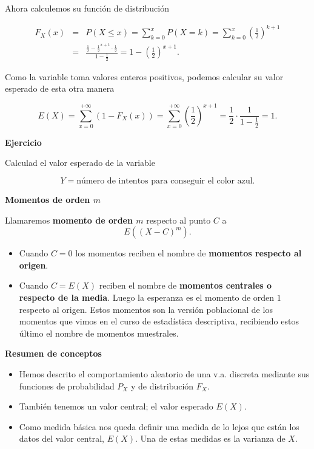 \documentclass[
  letterpaper,
  DIV=11,
  numbers=noendperiod]{scrreprt}
\providecommand{\tightlist}{%
  \setlength{\itemsep}{0pt}\setlength{\parskip}{0pt}}\usepackage{longtable,booktabs,array}
\begin{document}
Ahora calculemos su función de distribución

\begin{eqnarray*}
F_X(x)&=& P(X\leq x)=\sum_{k=0}^x P(X=k)=\sum_{k=0}^x
\left(\frac12\right)^{k+1}\\
&=& \frac{\frac12-\frac12^{x+1}\cdot
\frac12}{1-\frac12}=1-\left(\frac12\right)^{x+1}.
\end{eqnarray*}

Como la variable toma valores enteros positivos, podemos calcular su
valor esperado de esta otra manera

\[E(X)=\sum_{x=0}^{+\infty} (1-F_X(x))=\sum_{x=0}^{+\infty}\left(\frac12\right)^{x+1}=\frac12\cdot
\frac1{1-\frac12}=1.\]

\textbf{Ejercicio}

Calculad el valor esperado de la variable

\[
Y=\mbox{número de intentos para conseguir el color azul.}
\]

\textbf{Momentos de orden \(m\)}

Llamaremos \textbf{momento de orden \(m\)} respecto al punto \(C\) a
\[E\left((X-C)^m\right).\]

\begin{itemize}
\tightlist
\item
  Cuando \(C=0\) los momentos reciben el nombre de \textbf{momentos
  respecto al origen}.
\item
  Cuando \(C=E(X)\) reciben el nombre de \textbf{momentos centrales o
  respecto de la media}. Luego la esperanza es el momento de orden \(1\)
  respecto al origen. Estos momentos son la versión poblacional de los
  momentos que vimos en el curso de estadística descriptiva, recibiendo
  estos último el nombre de momentos muestrales.
\end{itemize}

\textbf{Resumen de conceptos}

\begin{itemize}
\tightlist
\item
  Hemos descrito el comportamiento aleatorio de una v.a. discreta
  mediante sus funciones de probabilidad \(P_{X}\) y de distribución
  \(F_{X}\).
\item
  También tenemos un valor central; el valor esperado \(E(X)\).
\item
  Como medida básica nos queda definir una medida de lo lejos que están
  los datos del valor central, \(E(X)\). Una de estas medidas es la
  varianza de \(X\).
\end{itemize}
\end{document}
